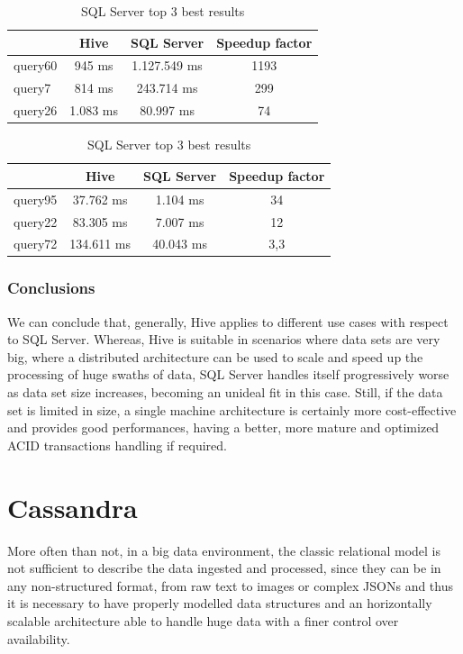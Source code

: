 \begin{table}[!htb]
    \begin{center}
            \caption{Hive top 3 best results}
        \begin{tabular}{|l|c|c|c|} \hline
            & Hive & SQL Server & Speedup factor\\ \hline
            query60 & 945 ms & 1.127.549 ms & 1193 \\ \hline
            query7 & 814 ms & 243.714 ms & 299 \\ \hline
            query26 & 1.083 ms & 80.997 ms & 74 \\ \hline
        \end{tabular}
    \bigskip
    \caption{SQL Server top 3 best results}
        \begin{tabular}{|l|c|c|c|} \hline
        & Hive & SQL Server & Speedup factor\\ \hline
        query95 & 37.762 ms & 1.104 ms & 34 \\ \hline
        query22 & 83.305 ms & 7.007 ms & 12 \\ \hline
        query72 & 134.611 ms & 40.043 ms & 3,3 \\ \hline
    \end{tabular}
    \end{center}
\end{table}

\subsubsection{Conclusions}

We can conclude that, generally, Hive applies to different use cases with respect to SQL Server. Whereas, Hive is suitable in scenarios where data sets are very big, where a distributed architecture can be used to scale and speed up the processing of huge swaths of data, SQL Server handles itself progressively worse as data set size increases, becoming an unideal fit in this case. Still, if the data set is limited in size, a single machine architecture is certainly more cost-effective and provides good performances, having a better, more mature and optimized ACID transactions handling if required.

\section{Cassandra}

More often than not, in a big data environment, the classic relational model is not sufficient to describe the data ingested and processed, since they can be in any non-structured format, from raw text to images or complex JSONs and thus it is necessary to have properly modelled data structures and an horizontally scalable architecture able to handle huge data with a finer control over availability.


